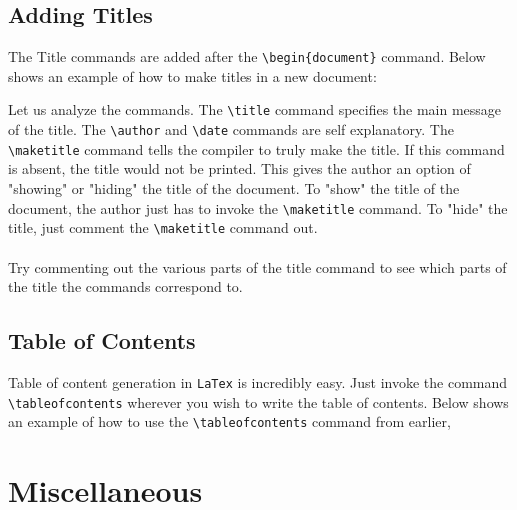 \documentclass[a4paper, 12pt]{report}
\begin{document}
\begin{center}
\subsection{Adding Titles}
\begin{comment}
\end{comment}
The Title commands are added after the \texttt{\textbackslash begin\{document\}} command. Below shows an example of how to make titles in a new document:

Let us analyze the commands. The \texttt{\textbackslash title} command specifies the main message of the title. The \texttt{\textbackslash author} and \texttt{\textbackslash date} commands are self explanatory. The \texttt{\textbackslash maketitle} command tells the compiler to truly make the title. If this command is absent, the title would not be printed. This gives the author an option of "showing" or "hiding" the title of the document. To "show" the title of the document, the author just has to invoke the \texttt{\textbackslash maketitle} command. To "hide" the title, just comment the \texttt{\textbackslash maketitle} command out.
\\~\\Try commenting out the various parts of the title command to see which parts of the title the commands correspond to.

\subsection{Table of Contents}
\begin{comment}
\end{comment}
Table of content generation in \texttt{LaTex} is incredibly easy. Just invoke the command \texttt{\textbackslash tableofcontents} wherever you wish to write the table of contents. Below shows an example of how to use the \texttt{\textbackslash tableofcontents} command from earlier,


\section{Miscellaneous}
\begin{comment}
\end{comment}


\end{center}
\end{document}
